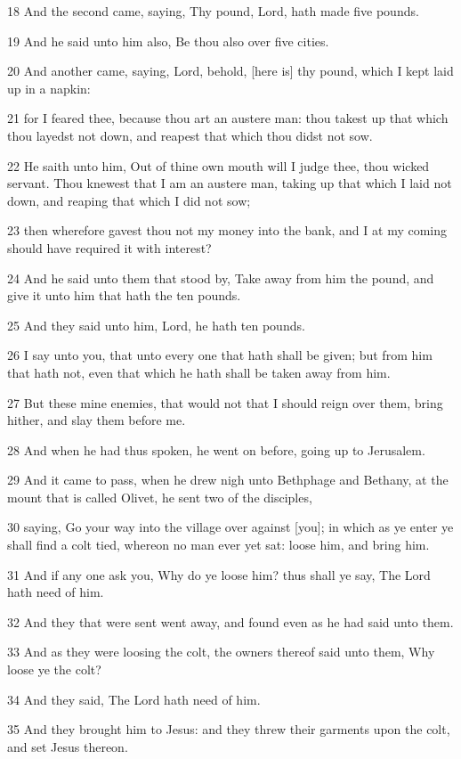 \par 18 And the second came, saying, Thy pound, Lord, hath made five pounds.
\par 19 And he said unto him also, Be thou also over five cities.
\par 20 And another came, saying, Lord, behold, [here is] thy pound, which I kept laid up in a napkin:
\par 21 for I feared thee, because thou art an austere man: thou takest up that which thou layedst not down, and reapest that which thou didst not sow.
\par 22 He saith unto him, Out of thine own mouth will I judge thee, thou wicked servant. Thou knewest that I am an austere man, taking up that which I laid not down, and reaping that which I did not sow;
\par 23 then wherefore gavest thou not my money into the bank, and I at my coming should have required it with interest?
\par 24 And he said unto them that stood by, Take away from him the pound, and give it unto him that hath the ten pounds.
\par 25 And they said unto him, Lord, he hath ten pounds.
\par 26 I say unto you, that unto every one that hath shall be given; but from him that hath not, even that which he hath shall be taken away from him.
\par 27 But these mine enemies, that would not that I should reign over them, bring hither, and slay them before me.
\par 28 And when he had thus spoken, he went on before, going up to Jerusalem.
\par 29 And it came to pass, when he drew nigh unto Bethphage and Bethany, at the mount that is called Olivet, he sent two of the disciples,
\par 30 saying, Go your way into the village over against [you]; in which as ye enter ye shall find a colt tied, whereon no man ever yet sat: loose him, and bring him.
\par 31 And if any one ask you, Why do ye loose him? thus shall ye say, The Lord hath need of him.
\par 32 And they that were sent went away, and found even as he had said unto them.
\par 33 And as they were loosing the colt, the owners thereof said unto them, Why loose ye the colt?
\par 34 And they said, The Lord hath need of him.
\par 35 And they brought him to Jesus: and they threw their garments upon the colt, and set Jesus thereon.
